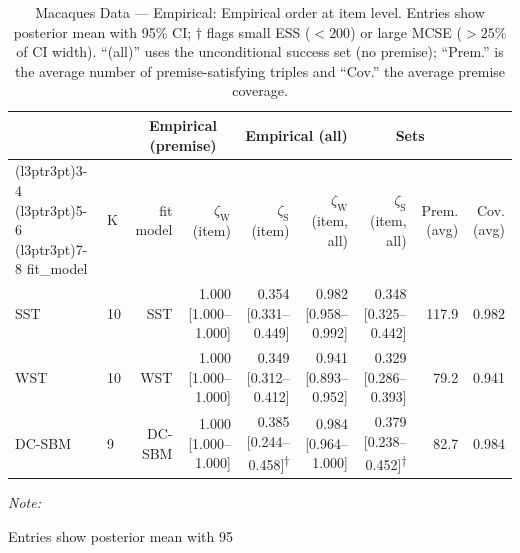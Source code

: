 \begin{table}
\centering
\caption{\label{tab:tab:macaques-data-empirical-emp-item}Macaques Data — Empirical: Empirical order at item level. Entries show posterior mean with 95\% CI; $\dagger$ flags small ESS ($<200$) or large MCSE ($>25\%$ of CI width). “(all)” uses the unconditional success set (no premise); “Prem.” is the average number of premise-satisfying triples and “Cov.” the average premise coverage.}
\centering
\begin{threeparttable}
\begin{tabular}[t]{llrrrrrrr}
\toprule
\multicolumn{2}{c}{ } & \multicolumn{2}{c}{Empirical (premise)} & \multicolumn{2}{c}{Empirical (all)} & \multicolumn{2}{c}{Sets} \\
\cmidrule(l{3pt}r{3pt}){3-4} \cmidrule(l{3pt}r{3pt}){5-6} \cmidrule(l{3pt}r{3pt}){7-8}
fit_model & K & fit model & $\zeta_{\mathrm{W}}$ (item) & $\zeta_{\mathrm{S}}$ (item) & $\zeta_{\mathrm{W}}$ (item, all) & $\zeta_{\mathrm{S}}$ (item, all) & Prem. (avg) & Cov. (avg)\\
\midrule
SST & 10 & SST & 1.000 [1.000--1.000] & 0.354 [0.331--0.449] & 0.982 [0.958--0.992] & 0.348 [0.325--0.442] & 117.9 & 0.982\\
WST & 10 & WST & 1.000 [1.000--1.000] & 0.349 [0.312--0.412] & 0.941 [0.893--0.952] & 0.329 [0.286--0.393] & 79.2 & 0.941\\
DC-SBM & 9 & DC-SBM & 1.000 [1.000--1.000] & 0.385 [0.244--0.458]\textsuperscript{$\dagger$} & 0.984 [0.964--1.000] & 0.379 [0.238--0.452]\textsuperscript{$\dagger$} & 82.7 & 0.984\\
\bottomrule
\end{tabular}
\begin{tablenotes}
\item \textit{Note: } 
\item Entries show posterior mean with 95%
\end{tablenotes}
\end{threeparttable}
\end{table}
